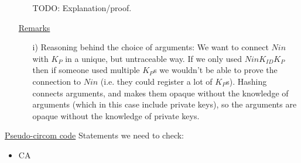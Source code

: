 \documentclass{article}
\newcommand{\khk}{K_{P}}
\newcommand{\kid}{K_{ID}}
\begin{document}
\begin{enumerate}[leftmargin=0cm]
\begin{itemize}
    TODO: Explanation/proof.
\end{itemize}

\item[] \underline{Remarks}
\begin{itemize}
\item[i)] Reasoning behind the choice of arguments:
We want to connect $Nin$ with $\khk$ in a unique, but untraceable way.
If we only used $Nin\kid\khk$ then if someone used multiple $\khk$s we wouldn't be able to prove the connection to $Nin$ (i.e. they could register a lot of $\khk$s).
Hashing connects arguments, and makes them opaque without the knowledge of arguments (which in this case include private keys), so the arguments are opaque without the knowledge of private keys.
\end{itemize}


\end{enumerate}

\newpage
\underline{Pseudo-circom code}
Statements we need to check:
\begin{itemize}
	\item CA
\end{itemize}
\end{document}
